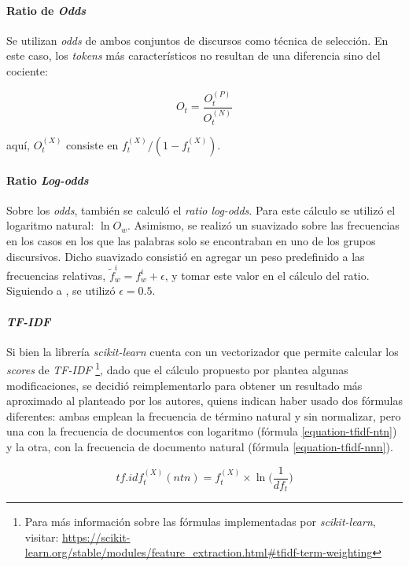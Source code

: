 \paragraph{Ratio de \textit{Odds}}
Se utilizan \textit{odds} de ambos conjuntos de discursos como
técnica de selección. En este caso, los \textit{tokens} más característicos
no resultan de una diferencia sino del cociente:

\begin{equation}
    O_{t} = \frac{O_{t}^{(P)}}{O_{t}^{(N)}}
\end{equation}

aqu\'i, $O_{t}^{(X)}$ consiste en $f_{t}^{(X)}/(1-f_{t}^{(X)})$.

\paragraph{Ratio \textit{Log-odds}}
Sobre los \textit{odds}, tambi\'en se calcul\'o el \textit{ratio log-odds}.
Para este c\'alculo se utiliz\'o el logaritmo natural: $\ln{O_w}$.
Asimismo, se realizó un suavizado sobre las frecuencias en los casos
en los que las palabras solo se encontraban en uno de los grupos
discursivos. Dicho suavizado consistió en agregar un peso predefinido a las
frecuencias relativas, $\tilde{f}^{i}_{w} = f^{i}_{w}+\epsilon$, y tomar
este valor en el cálculo del ratio. Siguiendo a \cite{monroe2008fightin},
se utilizó $\epsilon=0.5$.

\paragraph{\textit{TF-IDF}}
\label{paragraph-methods-tfidf}
Si bien la librería \textit{scikit-learn} cuenta con un vectorizador
que permite calcular los \textit{scores} de \textit{TF-IDF}
\footnote{Para m\'as informaci\'on sobre las f\'ormulas
implementadas por \textit{scikit-learn}, visitar:
\url{https://scikit-learn.org/stable/modules/feature_extraction.html\#tfidf-term-weighting}},
dado que el cálculo propuesto por  plantea
algunas modificaciones, se decidió reimplementarlo para obtener un resultado
más aproximado al planteado por los autores, quiens indican haber usado
dos fórmulas diferentes: ambas emplean la frecuencia
de término natural y sin normalizar, pero una con la frecuencia de documentos
con logaritmo (fórmula \ref{equation-tfidf-ntn}) y la otra, con la frecuencia
de documento natural (fórmula \ref{equation-tfidf-nnn}).

\begin{equation}
\label{equation-tfidf-ntn}
    tf.idf_{t}^{(X)}(ntn) = f_{t}^{(X)} \times \ln\bigg({\frac{1}{df_{t}}}\bigg)
\end{equation}

